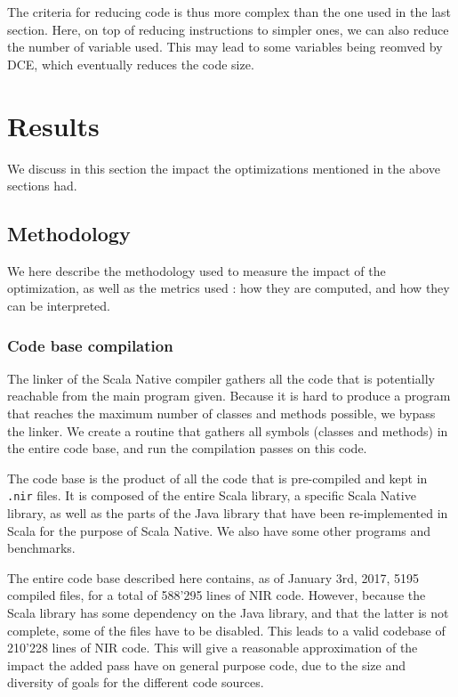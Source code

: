 \documentclass[11pt,a4paper]{article}
\begin{document}
The criteria for reducing code is thus more complex than the one used in the last section. Here, on top of reducing instructions to simpler ones, we can also reduce the number of variable used. This may lead to some variables being reomved by DCE, which eventually reduces the code size. 




\section{Results}

We discuss in this section the impact the optimizations mentioned in the above sections had.

\subsection{Methodology}

We here describe the methodology used to measure the impact of the optimization, as well as the metrics used : how they are computed, and how they can be interpreted.

\subsubsection{Code base compilation}

The linker of the Scala Native compiler gathers all the code that is potentially reachable from the main program given. Because it is hard to produce a program that reaches the maximum number of classes and methods possible, we bypass the linker. We create a routine that gathers all symbols (classes and methods) in the entire code base, and run the compilation passes on this code.

The code base is the product of all the code that is pre-compiled and kept in \texttt{.nir} files. It is composed of the entire Scala library, a specific Scala Native library, as well as the parts of the Java library that have been re-implemented in Scala for the purpose of Scala Native. We also have some other programs and benchmarks.

The entire code base described here contains, as of January 3rd, 2017, 5195 compiled files, for a total of 588'295 lines of NIR code. However, because the Scala library has some dependency on the Java library, and that the latter is not complete, some of the files have to be disabled. This leads to a valid codebase of 210'228 lines of NIR code. This will give a reasonable approximation of the impact the added pass have on general purpose code, due to the size and diversity of goals for the different code sources.
\end{document}
